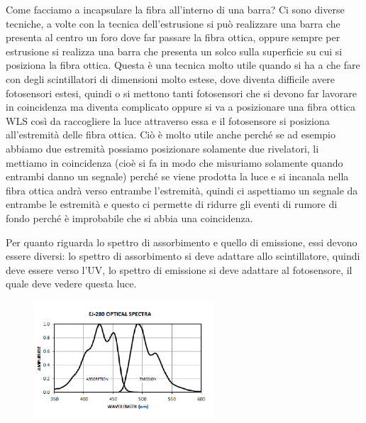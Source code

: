 Come facciamo a incapsulare la fibra all'interno di una barra? Ci sono diverse tecniche, a volte con la tecnica dell'estrusione si può realizzare una barra che presenta al centro un foro dove far passare la fibra ottica, oppure sempre per estrusione si realizza una barra che presenta un solco sulla superficie su cui si posiziona la fibra ottica. Questa è una tecnica molto utile quando si ha a che fare con degli scintillatori di dimensioni molto estese, dove diventa difficile avere fotosensori estesi, quindi o si mettono tanti fotosensori che si devono far lavorare in coincidenza ma diventa complicato oppure si va a posizionare una fibra ottica WLS così da raccogliere la luce attraverso essa e il fotosensore si posiziona all'estremità delle fibra ottica. Ciò è molto utile anche perché se ad esempio abbiamo due estremità possiamo posizionare solamente due rivelatori, li mettiamo in coincidenza (cioè si fa in modo che misuriamo solamente quando entrambi danno un segnale) perché se viene prodotta la luce e si incanala nella fibra ottica andrà verso entrambe l'estremità, quindi ci aspettiamo un segnale da entrambe le estremità e questo ci permette di ridurre gli eventi di rumore di fondo perché è improbabile che si abbia una coincidenza. 

Per quanto riguarda lo spettro di assorbimento e quello di emissione, essi devono essere diversi: lo spettro di assorbimento si deve adattare allo scintillatore, quindi deve essere verso l'UV, lo spettro di emissione si deve adattare al fotosensore, il quale deve vedere questa luce.

\begin{figure}[H]
   \centering
   \includegraphics[width=0.6\textwidth]{immagini/spettro_emissione_assorbimento_fibre_WLS.png}
\end{figure}


